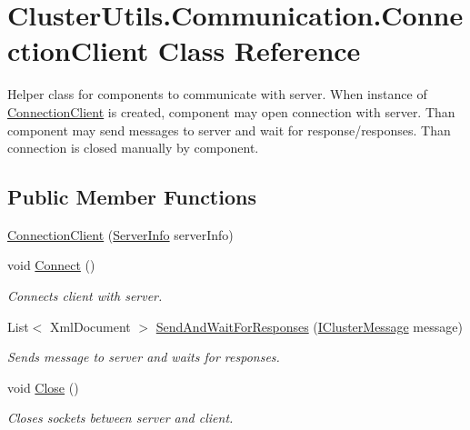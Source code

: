 \hypertarget{class_cluster_utils_1_1_communication_1_1_connection_client}{}\section{Cluster\+Utils.\+Communication.\+Connection\+Client Class Reference}
\label{class_cluster_utils_1_1_communication_1_1_connection_client}


Helper class for components to communicate with server. When instance of \hyperlink{class_cluster_utils_1_1_communication_1_1_connection_client}{Connection\+Client} is created, component may open connection with server. Than component may send messages to server and wait for response/responses. Than connection is closed manually by component.  


\subsection*{Public Member Functions}
\begin{DoxyCompactItemize}
\item 
\hyperlink{class_cluster_utils_1_1_communication_1_1_connection_client_a5a9bddaca9c5264f760e8b5e51abbd44}{Connection\+Client} (\hyperlink{class_cluster_utils_1_1_server_info}{Server\+Info} server\+Info)
\item 
void \hyperlink{class_cluster_utils_1_1_communication_1_1_connection_client_a29d7584137a1f37fca15882812940899}{Connect} ()
\begin{DoxyCompactList}\small\item\em Connects client with server. \end{DoxyCompactList}\item 
List$<$ Xml\+Document $>$ \hyperlink{class_cluster_utils_1_1_communication_1_1_connection_client_a0c3e47e7c669479d4804c240bc9c87ff}{Send\+And\+Wait\+For\+Responses} (\hyperlink{interface_cluster_messages_1_1_i_cluster_message}{I\+Cluster\+Message} message)
\begin{DoxyCompactList}\small\item\em Sends message to server and waits for responses. \end{DoxyCompactList}\item 
void \hyperlink{class_cluster_utils_1_1_communication_1_1_connection_client_a6a2134ebda6076f29968e0216c25c132}{Close} ()
\begin{DoxyCompactList}\small\item\em Closes sockets between server and client. \end{DoxyCompactList}\end{DoxyCompactItemize}


